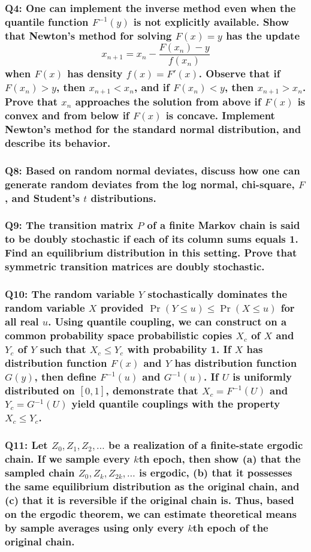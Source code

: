 \documentclass[8pt]{article}
\begin{document}
\subsubsection*{Q4:
One can implement the inverse method even when the quantile function \(F^{-1}(y)\) is not explicitly available. Show that Newton's method for solving \(F(x) = y\) has the update
\[
x_{n+1} = x_n - \frac{F(x_n) - y}{f(x_n)}
\]
when \(F(x)\) has density \(f(x) = F'(x)\). Observe that if \(F(x_n) > y\), then \(x_{n+1} < x_n\), and if \(F(x_n) < y\), then \(x_{n+1} > x_n\). Prove that \(x_n\) approaches the solution from above if \(F(x)\) is convex and from below if \(F(x)\) is concave. Implement Newton's method for the standard normal distribution, and describe its behavior.}

\subsubsection*{Q8:
Based on random normal deviates, discuss how one can generate random deviates from the log normal, chi-square, \(F\), and Student’s \(t\) distributions.}

\subsubsection*{Q9:
The transition matrix \(P\) of a finite Markov chain is said to be doubly stochastic if each of its column sums equals 1. Find an equilibrium distribution in this setting. Prove that symmetric transition matrices are doubly stochastic.}

\subsubsection*{Q10:
The random variable \(Y\) stochastically dominates the random variable \(X\) provided \(\Pr(Y \leq u) \leq \Pr(X \leq u)\) for all real \(u\). Using quantile coupling, we can construct on a common probability space probabilistic copies \(X_c\) of \(X\) and \(Y_c\) of \(Y\) such that \(X_c \leq Y_c\) with probability 1. If \(X\) has distribution function \(F(x)\) and \(Y\) has distribution function \(G(y)\), then define \(F^{-1}(u)\) and \(G^{-1}(u)\). If \(U\) is uniformly distributed on \([0, 1]\), demonstrate that \(X_c = F^{-1}(U)\) and \(Y_c = G^{-1}(U)\) yield quantile couplings with the property \(X_c \leq Y_c\).}

\subsubsection*{Q11:
Let \(Z_0, Z_1, Z_2, \ldots\) be a realization of a finite-state ergodic chain. If we sample every \(k\)th epoch, then show (a) that the sampled chain \(Z_0, Z_k, Z_{2k}, \ldots\) is ergodic, (b) that it possesses the same equilibrium distribution as the original chain, and (c) that it is reversible if the original chain is. Thus, based on the ergodic theorem, we can estimate theoretical means by sample averages using only every \(k\)th epoch of the original chain.}
\end{document}
